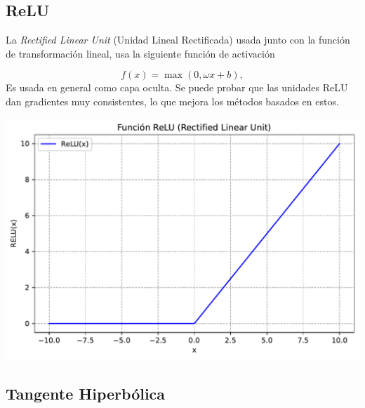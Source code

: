 \subsection{ReLU} 
\begin{minipage}{0.45\linewidth} 

La \textit{Rectified Linear Unit} (Unidad Lineal Rectificada) usada junto con la función de transformación lineal, usa la siguiente función de activación

\begin{equation}
    f(x) = \max (0,\omega x + b),
\end{equation}
Es usada en general como capa oculta. Se puede probar que las unidades ReLU dan gradientes muy consistentes, lo que mejora los métodos basados en estos.

\end{minipage} \hfill
\begin{minipage}{0.52\linewidth}
    \centering
    \includegraphics[width=1\linewidth]{Imagenes/03/ReLU.pdf}
\end{minipage}


\subsection{Tangente Hiperbólica}

